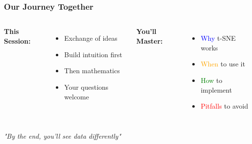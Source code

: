 \documentclass[aspectratio=169]{beamer}
\begin{document}
\begin{frame}
\frametitle{Our Journey Together}
\begin{columns}
\textbf{This Session:}
\begin{itemize}
\item Exchange of ideas
\item Build intuition first
\item Then mathematics
\item Your questions welcome
\end{itemize}

\textbf{You'll Master:}
\begin{itemize}
\item \textcolor{blue}{Why} t-SNE works
\item \textcolor{orange}{When} to use it
\item \textcolor{green}{How} to implement
\item \textcolor{red}{Pitfalls} to avoid
\end{itemize}
\end{columns}

\vspace{0.5cm}
\centering
\textit{"By the end, you'll see data differently"}

\end{frame}
\end{document}

